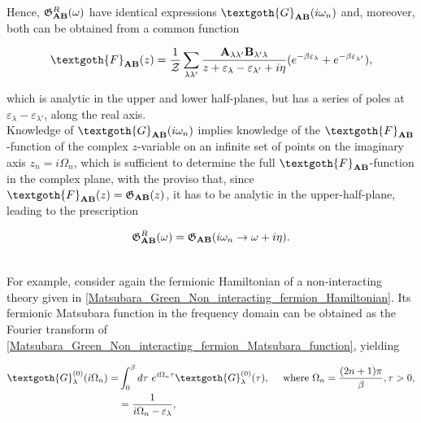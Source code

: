 Hence, $\mathfrak{G}^R_{{\bf AB}}(\omega)$ have identical expressions $\textgoth{G}_{{\bf AB}}(i\omega_n)$ and, moreover, both can be obtained from a common function 

\begin{equation}
    \textgoth{F}_{{\bf AB}}(z) =  \frac{1}{\mathcal{Z}} \sum_{\lambda \lambda'} \frac{
        {\bf A}_{\lambda \lambda'} {\bf B}_{\lambda' \lambda}}{z + \varepsilon_{\lambda} - \varepsilon_{\lambda'} + i\eta} ( e^{-\beta \varepsilon_{\lambda}} + e^{-\beta \varepsilon_{\lambda'}} ),
\end{equation}

which is analytic in the upper and lower half-planes, but has a series of poles at $\varepsilon_{\lambda} - \varepsilon_{\lambda'}$, along the real axis. \\

Knowledge of $\textgoth{G}_{{\bf AB}}(i\omega_n)$ implies knowledge of the $\textgoth{F}_{{\bf AB}}$-function of the complex $z$-variable on an infinite set of points on the imaginary axis $z_n = i\Omega_n$, which is sufficient to determine the full $\textgoth{F}_{{\bf AB}}$-function in the complex plane, with the proviso that, since $\textgoth{F}_{{\bf AB}}(z) = \mathfrak{G}_{{\bf AB}}(z)$, it has to be analytic in the upper-half-plane, leading to the prescription

\begin{equation*}
    \mathfrak{G}^R_{{\bf AB}}(\omega) = \mathfrak{G}_{{\bf AB}}(i\omega_n \rightarrow \omega + i\eta).
\end{equation*} 

\blanky \\

For example, consider again the fermionic Hamiltonian of a non-interacting theory given in \cref{Matsubara_Green_Non_interacting_fermion_Hamiltonian}. Its fermionic Matsubara function in the frequency domain can be obtained as the Fourier transform of \cref{Matsubara_Green_Non_interacting_fermion_Matsubara_function}, yielding

\begin{equation}
    \begin{split}
        \textgoth{G}_{\lambda}^{(0)}(i\Omega_n) =& \int_{0}^{\beta}d\tau \blanky e^{i\Omega_n \tau} \textgoth{G}_{\lambda}^{(0)}(\tau), \quad \textnormal{ where } \Omega_n = \frac{(2n+1)\pi}{\beta}, \tau > 0, \\
        &= \frac{1}{i\Omega_n - \varepsilon_{\lambda}},
    \end{split}
\end{equation}

